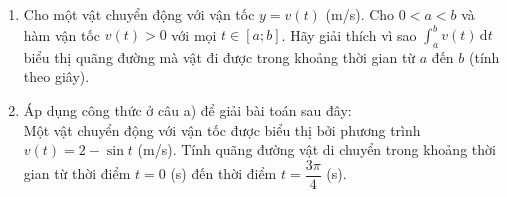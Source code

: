 \begin{bt}%
	\begin{enumerate}
		\item Cho một vật chuyển động với vận tốc $y=v(t)$ (m/s). Cho $0<a<b$ và hàm vận tốc $v(t)>0$ với mọi $t\in [a; b]$. Hãy giải thích vì sao $\displaystyle \int_a^b v(t)\mathrm{\,d}t$ biểu thị quãng đường  mà vật đi được trong khoảng thời gian từ $a$ đến $b$ (tính theo giây).
		\item Áp  dụng công thức ở câu a) để giải bài toán sau đây: \\
		Một vật chuyển động  với vận tốc được biểu thị bởi phương trình $v(t)=2-\sin t$ (m/s). Tính quãng đường vật di chuyển trong khoảng thời gian từ thời điểm $t=0$ (s) đến thời điểm $t=\dfrac{3\pi}{4}$ (s).
	\end{enumerate}
\end{bt}

